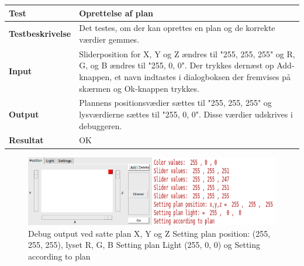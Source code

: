 \begin{table}[H]
\begin{tabular}{|l|l|}\hline
\textbf{Test} & Oprettelse af plan \\\hline

\textbf{Testbeskrivelse} & \multicolumn{1}{|m{11.5cm}|}{Det testes, om der kan oprettes en plan og de korrekte værdier gemmes.} \\\hline

\textbf{Input} & \multicolumn{1}{|m{11.5cm}|}{Sliderposition for X, Y og Z ændres til "255, 255, 255" og R, G, og B ændres til "255, 0, 0". Der trykkes dernæst op Add-knappen, et navn indtastes i dialogboksen der fremvises på skærmen og Ok-knappen trykkes.} \\\hline

\textbf{Output} & \multicolumn{1}{|m{11.5cm}|}{Plannens positionsvædier sættes til "255, 255, 255" og lysværdierne sættes til "255, 0, 0". Disse værdier udskrives i debuggeren.} \\\hline

\textbf{Resultat} & \multicolumn{1}{|m{11.5cm}|}{ OK} \\\hline

\end{tabular}
\end{table}

\begin{figure}[H]
\centering
\includegraphics[width=0.9\linewidth]{0_Filer/Figuer/testMakePlan.png}
\caption{Debug output ved satte plan X, Y og Z Setting plan position: (255, 255, 255), lyset R, G, B Setting plan Light (255, 0, 0) og Setting according to plan}
\label{fig:testmakePlan}
\end{figure}
